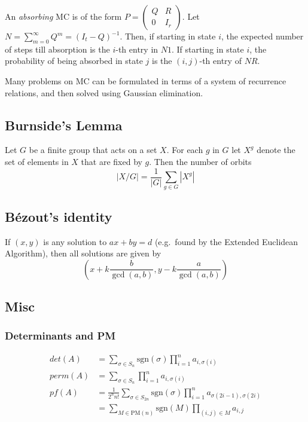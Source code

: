\documentclass[9pt,a4paper,twocolumn,landscape,oneside]{amsart}
\begin{document}
\begin{multicols*}{3}
            An \textit{absorbing} MC is of the form $P = \left(\begin{matrix} Q & R
            \\ 0 & I_r \end{matrix}\right)$. Let $N = \sum_{m=0}^\infty Q^m = (I_t
            - Q)^{-1}$. Then, if starting in state $i$, the expected number of
            steps till absorption is the $i$-th entry in $N1$. If starting in state
            $i$, the probability of being absorbed in state $j$ is the $(i,j)$-th
            entry of $NR$.

            Many problems on MC can be formulated in terms of a system of
            recurrence relations, and then solved using Gaussian elimination.

        \subsection{Burnside's Lemma}
            Let $G$ be a finite group that acts on a set $X$. For each $g$ in $G$
            let $X^g$ denote the set of elements in $X$ that are fixed by $g$. Then
            the number of orbits \[ |X/G| = \frac{1}{|G|} \sum_{g\in G} |X^g| \]

        \subsection{Bézout's identity}
            If $(x,y)$ is any solution to $ax+by=d$ (e.g.\ found by the Extended
            Euclidean Algorithm), then all solutions are given by \[
            \left(x+k\frac{b}{\gcd(a,b)}, y-k\frac{a}{\gcd(a,b)}\right) \]

        \subsection{Misc}
            \subsubsection{Determinants and PM}
                \begin{align*}
                    det(A) &= \sum_{\sigma \in S_n}\text{sgn}(\sigma)\prod_{i = 1}^n a_{i,\sigma(i)}\\
                    perm(A) &= \sum_{\sigma \in S_n} \prod_{i = 1}^n a_{i,\sigma(i)}\\
                    pf(A) &= \frac{1}{2^nn!}\sum_{\sigma \in S_{2n}} \text{sgn}(\sigma)\prod_{i = 1}^n a_{\sigma(2i-1),\sigma(2i)}\\ &= \sum_{M \in \text{PM}(n)} \text{sgn}(M) \prod_{(i,j) \in M} a_{i,j}
                \end{align*}


\end{multicols*}
\end{document}
